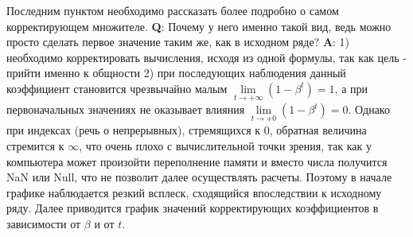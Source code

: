 Последним пунктом необходимо рассказать более подробно о самом корректирующем множителе. \textbf{Q}: Почему у него именно такой вид, ведь можно просто сделать первое значение таким же, как в исходном ряде? \textbf{A}: 1) необходимо корректировать вычисления, исходя из одной формулы, так как цель - прийти именно к общности 2) при последующих наблюдения данный коэффициент становится чрезвычайно малым $\lim\limits_{t \to +\infty}(1 - \beta^t) = 1$, а при первоначальных значениях не оказывает влияния $\lim\limits_{t \to +0}(1 - \beta^t) = 0$. Однако при индексах (речь о непрерывных), стремящихся к $0$, обратная величина стремится к $\infty$, что очень плохо с вычислительной точки зрения, так как у компьютера может произойти переполнение памяти и вместо числа получится NaN или Null, что не позволит далее осуществлять расчеты. Поэтому в начале графике наблюдается резкий всплеск, сходящийся впоследствии к исходному ряду. Далее приводится график значений корректирующих коэффициентов в зависимости от $\beta$ и от $t$.
